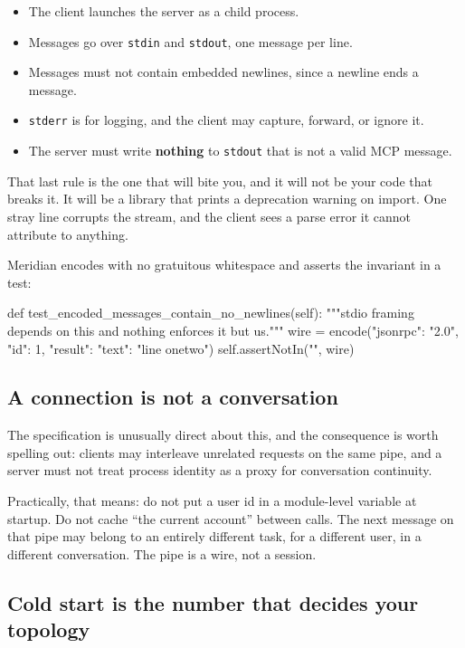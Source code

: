 \begin{itemize}[leftmargin=1.6em, itemsep=3pt]
\item The client launches the server as a child process.
\item Messages go over \texttt{stdin} and \texttt{stdout}, one message per line.
\item Messages must not contain embedded newlines, since a newline ends a
message.
\item \texttt{stderr} is for logging, and the client may capture, forward, or
ignore it.
\item The server must write \textbf{nothing} to \texttt{stdout} that is not a
valid MCP message.
\end{itemize}

That last rule is the one that will bite you, and it will not be your code that
breaks it. It will be a library that prints a deprecation warning on import. One
stray line corrupts the stream, and the client sees a parse error it cannot
attribute to anything.

Meridian encodes with no gratuitous whitespace and asserts the invariant in a
test:

\begin{py}
def test_encoded_messages_contain_no_newlines(self):
    """stdio framing depends on this and nothing enforces it but us."""
    wire = encode({"jsonrpc": "2.0", "id": 1,
                   "result": {"text": "line one\nline two"}})
    self.assertNotIn("\n", wire)
\end{py}

\subsection{A connection is not a conversation}

The specification is unusually direct about this, and the consequence is worth
spelling out: clients may interleave unrelated requests on the same pipe, and a
server must not treat process identity as a proxy for conversation continuity.

Practically, that means: do not put a user id in a module-level variable at
startup. Do not cache ``the current account'' between calls. The next message on
that pipe may belong to an entirely different task, for a different user, in a
different conversation. The pipe is a wire, not a session.

\subsection{Cold start is the number that decides your topology}

